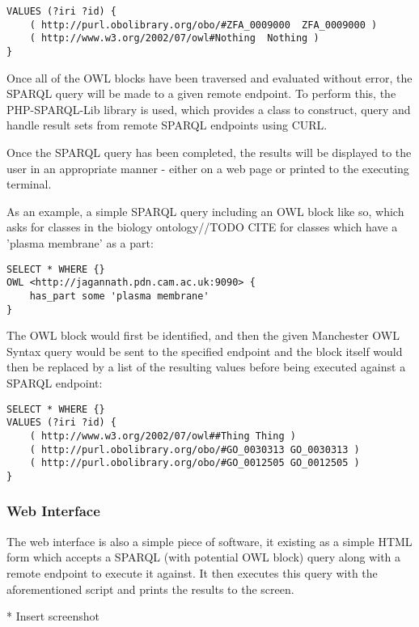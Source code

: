 \documentclass{article}
\begin{document}
\begin{lstlisting}
VALUES (?iri ?id) { 
    ( http://purl.obolibrary.org/obo/#ZFA_0009000  ZFA_0009000 ) 
    ( http://www.w3.org/2002/07/owl#Nothing  Nothing )
}
\end{lstlisting}

Once all of the OWL blocks have been traversed and evaluated without error, the
SPARQL query will be made to a given remote endpoint. To perform this, the 
PHP-SPARQL-Lib library\cite{phpsparqllib} is used, which provides a class to 
construct, query and handle result sets from remote SPARQL endpoints using CURL.

Once the SPARQL query has been completed, the results will be displayed to the
user in an appropriate manner - either on a web page or printed to the executing
terminal.

As an example, a simple SPARQL query including an OWL block like so, which asks
for classes in the biology ontology//TODO CITE for classes which have a 'plasma
membrane' as a part:

\begin{lstlisting}
SELECT * WHERE {}
OWL <http://jagannath.pdn.cam.ac.uk:9090> {
    has_part some 'plasma membrane'
}
\end{lstlisting}

The OWL block would first be identified, and then the given Manchester OWL
Syntax query would be sent to the specified endpoint and the block itself would
then be replaced by a list of the resulting values before being executed against
a SPARQL endpoint:

\begin{lstlisting}
SELECT * WHERE {} 
VALUES (?iri ?id) { 
    ( http://www.w3.org/2002/07/owl##Thing Thing ) 
    ( http://purl.obolibrary.org/obo/#GO_0030313 GO_0030313 ) 
    ( http://purl.obolibrary.org/obo/#GO_0012505 GO_0012505 ) 
}
\end{lstlisting}

\subsubsection{Web Interface}

The web interface is also a simple piece of software, it existing as a simple
HTML form which accepts a SPARQL (with potential OWL block) query along with a
remote endpoint to execute it against. It then executes this query with the
aforementioned script and prints the results to the screen.

* Insert screenshot
\end{document}
